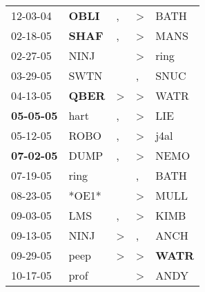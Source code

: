 \begin{supertabular}{p{0.07\textwidth}p{0.06\textwidth}p{0.02\textwidth}p{0.02\textwidth}p{0.06\textwidth}}
          12-03-04\textsuperscript{} &  \textbf{OBLI\textsuperscript{}} &                , &     \textgreater &           BATH\textsuperscript{} \\
          02-18-05\textsuperscript{} &  \textbf{SHAF\textsuperscript{}} &                , &     \textgreater &           MANS\textsuperscript{} \\
          02-27-05\textsuperscript{} &           NINJ\textsuperscript{} &                  &     \textgreater &           ring\textsuperscript{} \\
          03-29-05\textsuperscript{} &           SWTN\textsuperscript{} &                  &                , &           SNUC\textsuperscript{} \\
          04-13-05\textsuperscript{} &  \textbf{QBER\textsuperscript{}} &     \textgreater &     \textgreater &           WATR\textsuperscript{} \\
 \textbf{05-05-05\textsuperscript{}} &           hart\textsuperscript{} &                , &     \textgreater &            LIE\textsuperscript{} \\
          05-12-05\textsuperscript{} &           ROBO\textsuperscript{} &                , &     \textgreater &           j4al\textsuperscript{} \\
 \textbf{07-02-05\textsuperscript{}} &           DUMP\textsuperscript{} &                , &     \textgreater &           NEMO\textsuperscript{} \\
          07-19-05\textsuperscript{} &           ring\textsuperscript{} &                  &                , &           BATH\textsuperscript{} \\
          08-23-05\textsuperscript{} &                            *OE1* &                  &     \textgreater &           MULL\textsuperscript{} \\
          09-03-05\textsuperscript{} &            LMS\textsuperscript{} &                , &     \textgreater &           KIMB\textsuperscript{} \\
          09-13-05\textsuperscript{} &           NINJ\textsuperscript{} &     \textgreater &                , &           ANCH\textsuperscript{} \\
          09-29-05\textsuperscript{} &           peep\textsuperscript{} &     \textgreater &     \textgreater &  \textbf{WATR\textsuperscript{}} \\
          10-17-05\textsuperscript{} &           prof\textsuperscript{} &                  &     \textgreater &           ANDY\textsuperscript{} \\

\end{supertabular}
